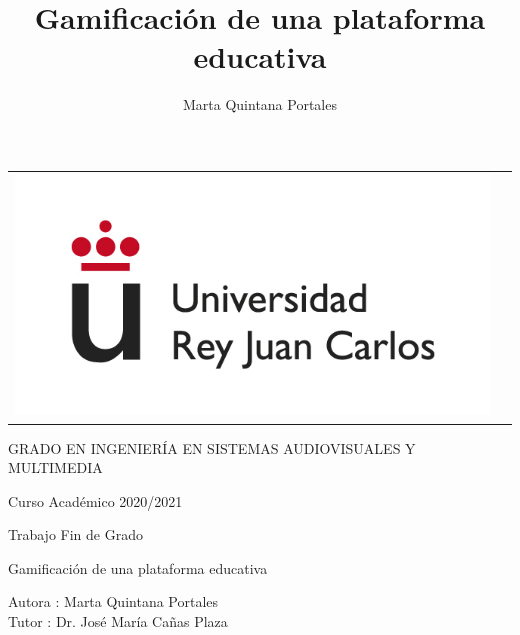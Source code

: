 \documentclass[a4paper, 12pt]{book}
\title{Gamificación de una plataforma educativa}
\author{Marta Quintana Portales}
\begin{document}
\begin{titlepage}
\begin{center}
\begin{tabular}[c]{c c}
\includegraphics[scale=0.4]{logo-rey-juan-carlos.jpg} &
\end{tabular}


\vspace{3cm}

\Large
GRADO EN INGENIERÍA EN SISTEMAS AUDIOVISUALES Y MULTIMEDIA
\vspace{0.4cm}

\large
Curso Académico 2020/2021

\vspace{0.8cm}

Trabajo Fin de Grado

\vspace{1.5cm}

\LARGE
Gamificación de una plataforma educativa \vspace{3cm}

\large
Autora : Marta Quintana Portales\\
Tutor : Dr. José María Cañas Plaza \\
\end{center}
\end{titlepage}

\newpage
\mbox{}





\normalsize



\newpage
\tableofcontents

\end{document}
